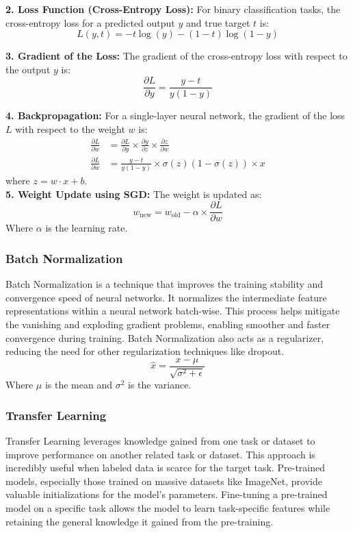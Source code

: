 \textbf{2. Loss Function (Cross-Entropy Loss):}
For binary classification tasks, the cross-entropy loss for a predicted output \( y \) and true target \( t \) is:
\[
L(y, t) = -t \log(y) - (1 - t) \log(1 - y)
\]

\textbf{3. Gradient of the Loss:}
The gradient of the cross-entropy loss with respect to the output \( y \) is:
\[
\frac{\partial L}{\partial y} = \frac{y - t}{y(1 - y)}
\]

\textbf{4. Backpropagation:}
For a single-layer neural network, the gradient of the loss \( L \) with respect to the weight \( w \) is:
\begin{align*}
\frac{\partial L}{\partial w} &= \frac{\partial L}{\partial y} \times \frac{\partial y}{\partial z} \times \frac{\partial z}{\partial w} \\
\frac{\partial L}{\partial w} &= \frac{y - t}{y(1 - y)} \times \sigma(z)(1 - \sigma(z)) \times x
\end{align*}
where \( z = w \cdot x + b \). \\

\textbf{5. Weight Update using SGD:}
The weight is updated as:
\[
w_{\text{new}} = w_{\text{old}} - \alpha \times \frac{\partial L}{\partial w}
\]
Where \( \alpha \) is the learning rate.
\subsubsection*{Batch Normalization}

Batch Normalization is a technique that improves the training stability and convergence speed of neural networks. It normalizes the intermediate feature representations within a neural network batch-wise. This process helps mitigate the vanishing and exploding gradient problems, enabling smoother and faster convergence during training. Batch Normalization also acts as a regularizer, reducing the need for other regularization techniques like dropout.
\[ \hat{x} = \frac{x - \mu}{\sqrt{\sigma^2 + \epsilon}} \]
Where \( \mu \) is the mean and \( \sigma^2 \) is the variance.

\subsubsection*{Transfer Learning}

Transfer Learning leverages knowledge gained from one task or dataset to improve performance on another related task or dataset. This approach is incredibly useful when labeled data is scarce for the target task. Pre-trained models, especially those trained on massive datasets like ImageNet, provide valuable initializations for the model's parameters. Fine-tuning a pre-trained model on a specific task allows the model to learn task-specific features while retaining the general knowledge it gained from the pre-training.\\

